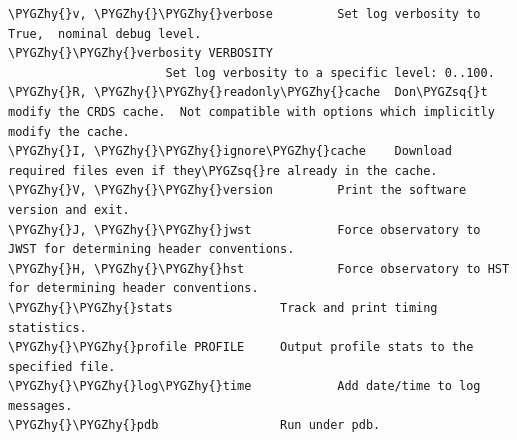 \documentclass[letterpaper,10pt,english]{sphinxmanual}
\def\PYGZhy{\char`\-}
\def\PYGZsq{\char`\'}
\renewcommand\PYGZsq{\textquotesingle}
\begin{document}
\begin{Verbatim}[commandchars=\\\{\}]
\PYGZhy{}v, \PYGZhy{}\PYGZhy{}verbose         Set log verbosity to True,  nominal debug level.
\PYGZhy{}\PYGZhy{}verbosity VERBOSITY
                      Set log verbosity to a specific level: 0..100.
\PYGZhy{}R, \PYGZhy{}\PYGZhy{}readonly\PYGZhy{}cache  Don\PYGZsq{}t modify the CRDS cache.  Not compatible with options which implicitly modify the cache.
\PYGZhy{}I, \PYGZhy{}\PYGZhy{}ignore\PYGZhy{}cache    Download required files even if they\PYGZsq{}re already in the cache.
\PYGZhy{}V, \PYGZhy{}\PYGZhy{}version         Print the software version and exit.
\PYGZhy{}J, \PYGZhy{}\PYGZhy{}jwst            Force observatory to JWST for determining header conventions.
\PYGZhy{}H, \PYGZhy{}\PYGZhy{}hst             Force observatory to HST for determining header conventions.
\PYGZhy{}\PYGZhy{}stats               Track and print timing statistics.
\PYGZhy{}\PYGZhy{}profile PROFILE     Output profile stats to the specified file.
\PYGZhy{}\PYGZhy{}log\PYGZhy{}time            Add date/time to log messages.
\PYGZhy{}\PYGZhy{}pdb                 Run under pdb.
\end{Verbatim}
\end{document}
